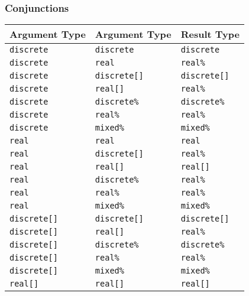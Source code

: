 \subsubsection{Conjunctions}
\begin{table}
\begin{center}
\begin{tabular}{|l|l|l|}
\hline
{\bf Argument Type} & {\bf Argument Type} & {\bf Result Type} \\ \hline
{\tt discrete}      & {\tt discrete}      & {\tt discrete}    \\ \hline
{\tt discrete}      & {\tt real}          & {\tt real\%}      \\ \hline
{\tt discrete}      & {\tt discrete[]}    & {\tt discrete[]}  \\ \hline
{\tt discrete}      & {\tt real[]}        & {\tt real\%}      \\ \hline
{\tt discrete}      & {\tt discrete\%}    & {\tt discrete\%}  \\ \hline
{\tt discrete}      & {\tt real\%}        & {\tt real\%}      \\ \hline
{\tt discrete}      & {\tt mixed\%}       & {\tt mixed\%}     \\ \hline
{\tt real}          & {\tt real}          & {\tt real}        \\ \hline
{\tt real}          & {\tt discrete[]}    & {\tt real\%}      \\ \hline
{\tt real}          & {\tt real[]}        & {\tt real[]}      \\ \hline
{\tt real}          & {\tt discrete\%}    & {\tt real\%}      \\ \hline
{\tt real}          & {\tt real\%}        & {\tt real\%}      \\ \hline
{\tt real}          & {\tt mixed\%}       & {\tt mixed\%}     \\ \hline
{\tt discrete[]}    & {\tt discrete[]}    & {\tt discrete[]}  \\ \hline
{\tt discrete[]}    & {\tt real[]}        & {\tt real\%}      \\ \hline
{\tt discrete[]}    & {\tt discrete\%}    & {\tt discrete\%}  \\ \hline
{\tt discrete[]}    & {\tt real\%}        & {\tt real\%}      \\ \hline
{\tt discrete[]}    & {\tt mixed\%}       & {\tt mixed\%}     \\ \hline
{\tt real[]}        & {\tt real[]}        & {\tt real[]}      \\ \hline

\end{tabular}
\end{center}
\end{table}
